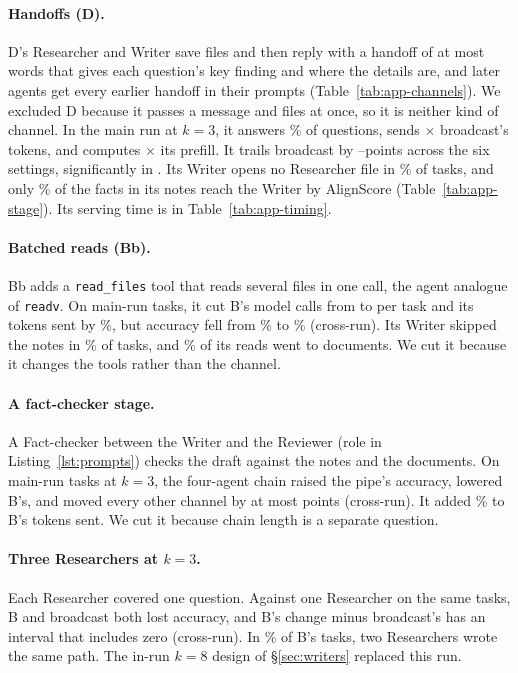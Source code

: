 \documentclass[sigplan,10pt,nonacm,review,anonymous]{acmart}
\begin{document}
\paragraph{Handoffs (D)\@.} D's Researcher and Writer save files and then reply with a handoff of at most
\nHandoffWords words that gives each question's key finding and where the details are, and later agents get
every earlier handoff in their prompts (Table~\ref{tab:app-channels}). We excluded D because it passes a message
and files at once, so it is neither kind of channel. In the main run at $k=3$, it answers \nAccD\% of questions,
sends \nAppDSent$\times$ broadcast's tokens, and computes \nAppDComp$\times$ its prefill. It trails broadcast by
\nGapDMin--\nGapDMax points across the six settings, significantly in \nGapDSigWord. Its Writer opens no
Researcher file in \nAppDNoNotes\% of tasks, and only \nDelivD\% of the facts in its notes reach the Writer by
AlignScore (Table~\ref{tab:app-stage}). Its serving time is in Table~\ref{tab:app-timing}.

\paragraph{Batched reads (Bb).} Bb adds a \texttt{read\_files} tool that reads several files in one call, the
agent analogue of \texttt{readv}. On \nBbN main-run tasks, it cut B's model calls from \nBbCallsB to \nBbCalls
per task and its tokens sent by \nBbTokCut\%, but accuracy fell from \nBbAccB\% to \nBbAcc\% (cross-run). Its
Writer skipped the notes in \nBbNoNotes\% of tasks, and \nBbDocReads\% of its reads went to documents. We cut it
because it changes the tools rather than the channel.

\paragraph{A fact-checker stage.} A Fact-checker between the Writer and the Reviewer (role in
Listing~\ref{lst:prompts}) checks the draft against the notes and the documents. On \nChainN main-run tasks
at $k=3$, the four-agent chain raised the pipe's accuracy, lowered B's, and moved every other channel by at most
\nAppChainOtherMax points (cross-run). It added \nChainBSent\% to B's tokens sent. We cut it because chain length is
a separate question.

\paragraph{Three Researchers at $k=3$.} Each Researcher covered one question. Against one Researcher on the same
tasks, B and broadcast both lost accuracy, and B's change minus broadcast's has an interval that includes zero
(cross-run). In \nFanClashB\% of B's tasks, two Researchers wrote the same path. The in-run $k=8$ design of
\S\ref{sec:writers} replaced this run.
\end{document}
